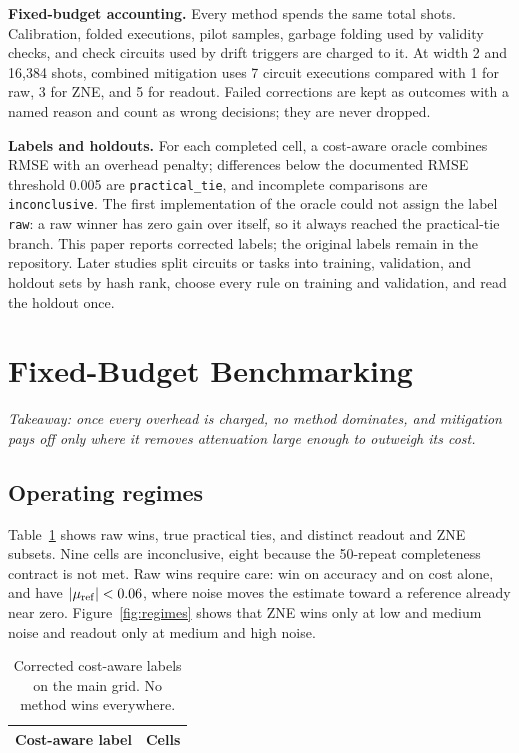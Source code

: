 \documentclass[10pt,twocolumn]{article}
\newcommand{\paragraphlead}[1]{\textbf{#1}\quad}
\begin{document}
\paragraphlead{Fixed-budget accounting.}
Every method spends the same total shots. Calibration, folded executions, pilot samples, garbage
folding used by validity checks, and check circuits used by drift triggers are charged to it. At
width 2 and 16,384 shots, combined mitigation uses 7 circuit executions compared with 1 for raw,
3 for ZNE, and 5 for readout. Failed corrections are kept as outcomes with a named reason and count
as wrong decisions; they are never dropped.

\paragraphlead{Labels and holdouts.}
For each completed cell, a cost-aware oracle combines RMSE with an overhead penalty; differences
below the documented RMSE threshold 0.005 are \texttt{practical\_tie}, and incomplete comparisons
are \texttt{inconclusive}. The first implementation of the oracle could not assign the label
\texttt{raw}: a raw winner has zero gain over itself, so it always reached the practical-tie branch.
This paper reports corrected labels; the original labels remain in the repository. Later studies
split circuits or tasks into training, validation, and holdout sets by hash rank, choose every rule
on training and validation, and read the holdout once.

\section{Fixed-Budget Benchmarking}
\label{sec:budget}
\emph{Takeaway: once every overhead is charged, no method dominates, and mitigation pays off only
where it removes attenuation large enough to outweigh its cost.}

\subsection{Operating regimes}
Table~\ref{tab:regimes} shows \VTwoRawWinners{} raw wins, \VTwoPracticalTies{} true
practical ties, and distinct readout and ZNE subsets. Nine cells are inconclusive,
eight because the 50-repeat completeness contract is not met. Raw wins require care:
\RawWinsAccuracy{} win on accuracy and \RawWinsCostOnly{} on cost alone, and
\RawWinsLowSignal{} have $|\mu_{\rm ref}|<0.06$, where noise moves the estimate toward a
reference already near zero. Figure~\ref{fig:regimes} shows that ZNE wins only at low and medium
noise and readout only at medium and high noise.

\begin{table}[t]
\centering
\caption{Corrected cost-aware labels on the main grid. No method wins everywhere.}
\label{tab:regimes}
\begin{tabular}{lr}
\toprule
Cost-aware label & Cells\\
\midrule

\end{tabular}
\end{table}
\end{document}
